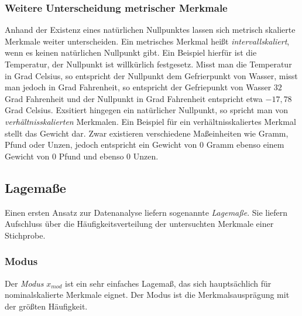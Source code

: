 \documentclass[fontsize=11pt]{scrartcl}
\begin{document}
                    \subsubsection{Weitere Unterscheidung metrischer Merkmale}
                        Anhand der Existenz eines natürlichen Nullpunktes lassen sich metrisch skalierte Merkmale weiter unterscheiden. Ein metrisches Merkmal heißt \emph{intervallskaliert}, wenn es keinen natürlichen Nullpunkt gibt. \cite{kohn2005} Ein Beispiel hierfür ist die Temperatur, der Nullpunkt ist willkürlich festgesetz. Misst man die Temperatur in Grad Celsius, so entspricht der Nullpunkt dem Gefrierpunkt von Wasser, misst man jedoch in Grad Fahrenheit, so entspricht der Gefriepunkt von Wasser $32$ Grad Fahrenheit und der Nullpunkt in Grad Fahrenheit entspricht etwa $-17,78$ Grad Celsius.
                        \newline
                        Exsitiert hingegen ein natürlicher Nullpunkt, so spricht man von \emph{verhältnisskalierten} Merkmalen. \cite{kohn2005}
                        \newline
                        Ein Beispiel für ein verhältnisskaliertes Merkmal stellt das Gewicht dar. Zwar existieren verschiedene Maßeinheiten wie Gramm, Pfund oder Unzen, jedoch entspricht ein Gewicht von $0$ Gramm ebenso einem Gewicht von $0$ Pfund und ebenso $0$ Unzen.
                
                \subsection{Lagemaße}
                    Einen ersten Ansatz zur Datenanalyse liefern sogenannte \emph{Lagemaße}. Sie liefern Aufschluss über die Häufigkeitsverteilung der untersuchten Merkmale einer Stichprobe. \cite{kohn2005}
                    
                    \subsubsection{Modus}
                        Der \emph{Modus} $x_{mod}$ ist ein sehr einfaches Lagemaß, das sich hauptsächlich für nominalskalierte Merkmale eignet. Der Modus ist die Merkmalsausprägung mit der größten Häufigkeit.\cite{kohn2005}
                    
\end{document}
